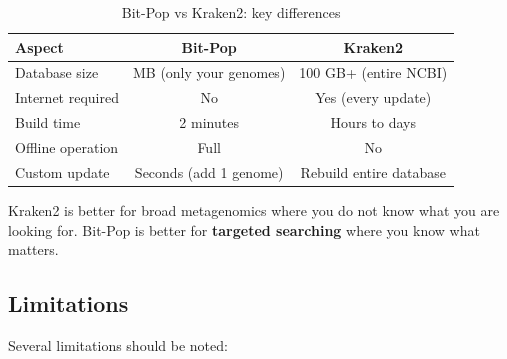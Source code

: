 \documentclass{article}
\begin{document}
\begin{table}[H]
\centering
\caption{Bit-Pop vs Kraken2: key differences}
\label{tab:kraken2}
\begin{tabular}{lcc}
\toprule
\textbf{Aspect} & \textbf{Bit-Pop} & \textbf{Kraken2} \\
\midrule
Database size & MB (only your genomes) & 100 GB+ (entire NCBI) \\
Internet required & No & Yes (every update) \\
Build time & 2 minutes & Hours to days \\
Offline operation & Full & No \\
Custom update & Seconds (add 1 genome) & Rebuild entire database \\
\bottomrule
\end{tabular}
\end{table}

Kraken2 is better for broad metagenomics where you do not know what you are looking for. Bit-Pop is better for \textbf{targeted searching} where you know what matters.

\subsection{Limitations}

Several limitations should be noted:
\end{document}

